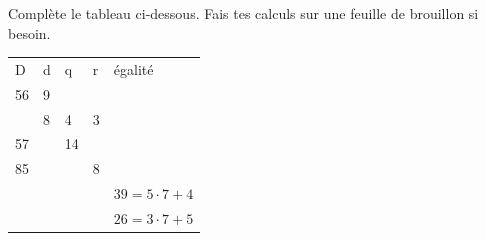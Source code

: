 %
%
Complète le tableau ci-dessous. Fais tes calculs sur une feuille de brouillon si besoin.
    \begin{tabular}{lllll}
        D  & d & q  & r & égalité         \\
        56 & 9 &    &   &                 \\
           & 8 & 4  & 3 &                 \\
        57 &   & 14 &   &                 \\
        85 &   &    & 8 &                 \\
           &   &    &   & $39=5\cdot 7+4$ \\
           &   &    &   & $26=3\cdot 7+5$
    \end{tabular}
